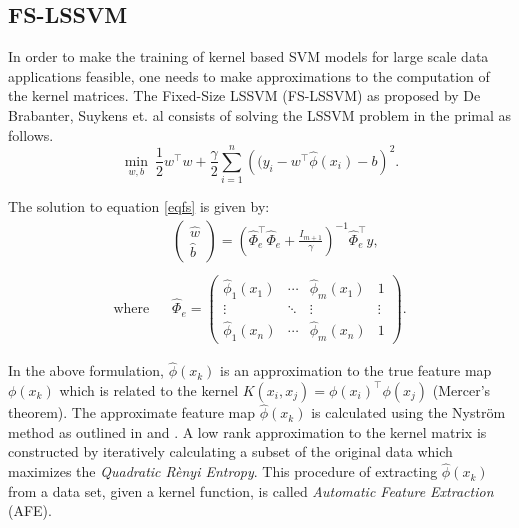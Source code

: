 \documentclass[conference, cmex10]{IEEEtran}
\begin{document}
\subsection{FS-LSSVM} \label{sec:fs}
In order to make the training of kernel based SVM models for large scale data applications feasible, one needs to make approximations to the computation of the kernel matrices. The Fixed-Size LSSVM (FS-LSSVM) as proposed by De Brabanter, Suykens et. al \cite{DeBrabanter2010,Suykens2002} consists of solving the LSSVM problem in the primal as follows.
\begin{equation}
\label{eqfs}
\min_{w,b} \ \frac{1}{2}w^{\intercal} w + \frac{\gamma}{2}\sum^{n}_{i=1} \left((y_{i} - w^{\intercal} \hat{\phi}(x_i) - b\right)^{2}.
\end{equation}

The solution to equation \ref{eqfs} is given by:
\begin{align}
\label{eqfssol}
& \left( \begin{matrix}
\hat{w}\\ 
\hat{b}
\end{matrix}\right ) = 
\left ( \hat{\Phi}^{\intercal}_e \hat{\Phi}_e + \frac{\mathit{I}_{m+1}}{\gamma} \right )^{-1} \hat{\Phi}^{\intercal}_e y,
\\ \nonumber \\
\text{where} \hspace{10pt}
& \hat{\Phi}_e = \begin{pmatrix}
\hat{\phi}_{1}(x_1) & \cdots & \hat{\phi}_{m}(x_1) & 1\\ 
\vdots &  \ddots & \vdots & \vdots\\ 
\hat{\phi}_{1}(x_n) & \cdots & \hat{\phi}_{m}(x_n) & 1
\end{pmatrix}. \nonumber
\end{align}

In the above formulation, $\hat{\phi}(x_k)$ is an approximation to the true feature map $\phi(x_k)$ which is related to the kernel $K(x_i, x_j) = \phi(x_i)^{\intercal} \phi(x_j)$ (Mercer's theorem). The approximate feature map $\hat{\phi}(x_k)$ is calculated using the Nystr\"om method as outlined in \cite{DeBrabanter2010,Mall2015} and \cite{Mall2013}. A low rank approximation to the kernel matrix is constructed by iteratively calculating a subset of the original data which maximizes the \textit{Quadratic R\`enyi Entropy}. This procedure of extracting $\hat{\phi}(x_k)$ from a data set, given a kernel function, is called \textit{Automatic Feature Extraction} (AFE).
\end{document}
